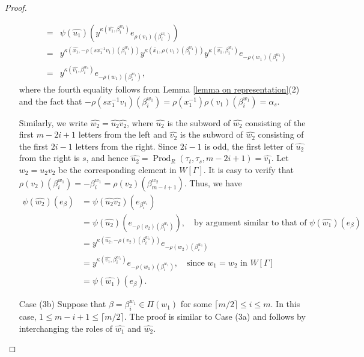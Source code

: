 \documentclass[12pt]{amsart}
\numberwithin{equation}{section}
\begin{document}
\begin{proof}
\begin{enumerate}
\begin{eqnarray*}
&=& \psi(\widehat{u_1})(y^{\kappa(\widehat{v_1},\beta^{w_1}_i)}e_{\rho(v_1)(\beta^{w_1}_i)})\\
&=&  y^{\kappa(\widehat{x_1},-\rho(sx_1^{-1}v_1)(\beta^{w_1}_i))} y^{\kappa(\widetilde{x_1},\rho(v_1)(\beta^{w_1}_i))} y^{\kappa(\widehat{v_1},\beta^{w_1}_i)}e_{-\rho(w_1)(\beta^{w_1}_i)}\\
&=& y^{\kappa(\widehat{v_1},\beta^{w_1}_i)}e_{-\rho(w_1)(\beta^{w_1}_i)},
\end{eqnarray*}
where the fourth equality follows from Lemma \ref{lemma on representation}(2) and the fact that $-\rho(sx_1^{-1}v_1)(\beta^{w_1}_i)=\rho(x_1^{-1})\rho(v_1)(\beta^{w_1}_i)=\alpha_s$.
\par
  
 
 Similarly, we write $\widehat{w_2}= \widehat{u_2} \widehat{v_2}$, where $\widehat{u_2}$ is the subword of $\widehat{w_2}$ consisting of the first $m-2i+1$ letters from the left and $\widehat{v_2}$ is the subword of $\widehat{w_2}$ consisting of the first $2i-1$ letters from the right.  Since $2i-1$ is odd, the first letter of  $\widehat{u_2}$ from the right is $s$, and hence $\widehat{u_2}=\operatorname{Prod}_R\left(\tau_t, \tau_s, m-2i+1\right)=\widehat{v_1}$. Let $w_2=u_2v_2$ be the corresponding element in $W[\Gamma]$. It is easy to verify that $\rho(v_2)(\beta^{w_1}_i)=-\beta^{w_1}_i=\rho(v_2)(\beta^{w_2}_{m-i+1})$. Thus, we have
\begin{align*}
   \psi(\widehat{w_2})(e_{\beta})&=\psi(\widehat{u_2} \widehat{v_2})(e_{\beta^{w_1}_i})\\
   &= \psi(\widehat{u_2})(e_{-\rho(v_2)(\beta^{w_1}_i)}), \quad \textrm{by argument similar to that of $\psi(\widehat{w_1})(e_\beta)$}\\
   &= y^{\kappa(\widehat{u_2},-\rho(v_2)(\beta^{w_1}_i))}e_{-\rho(w_2)(\beta^{w_1}_i)} \\
 &=y^{\kappa(\widehat{v_1},\beta^{w_1}_i)}e_{-\rho(w_1)(\beta^{w_1}_i)}, \quad \textrm{since $w_1=w_2$ in $W[\Gamma]$}\\
 &=    \psi(\widehat{w_1})(e_{\beta}).   
\end{align*}
\par
\item[Case (3b)]   Suppose that $\beta=\beta^{w_1}_i\in \Pi(w_1)$ for some $\lceil m/2 \rceil \leq i \le m$. In this case, $1 \le m-i+1 \leq \lceil m/2\rceil$. The proof is similar to Case (3a) and follows by interchanging the roles of $\widehat{w_1}$ and $\widehat{w_2}$.
\par


\end{enumerate}
\end{proof}
\end{document}
